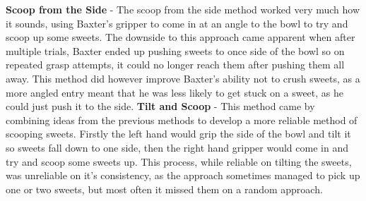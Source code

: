 \textbf{Scoop from the Side} - The scoop from the side method worked very much how it sounds, using Baxter's gripper to come in at an angle to the bowl to try and scoop up some sweets. The downside to this approach came apparent when after multiple trials, Baxter ended up pushing sweets to once side of the bowl so on repeated grasp attempts, it could no longer reach them after pushing them all away. This method did however improve Baxter's ability not to crush sweets, as a more angled entry meant that he was less likely to get stuck on a sweet, as he could just push it to the side.
\newline\newline
\textbf{Tilt and Scoop} - This method came by combining ideas from the previous methods to develop a more reliable method of scooping sweets. Firstly the left hand would grip the side of the bowl and tilt it so sweets fall down to one side, then the right hand gripper would come in and try and scoop some sweets up. This process, while reliable on tilting the sweets, was unreliable on it's consistency, as the approach sometimes managed to pick up one or two sweets, but most often it missed them on a random approach.
